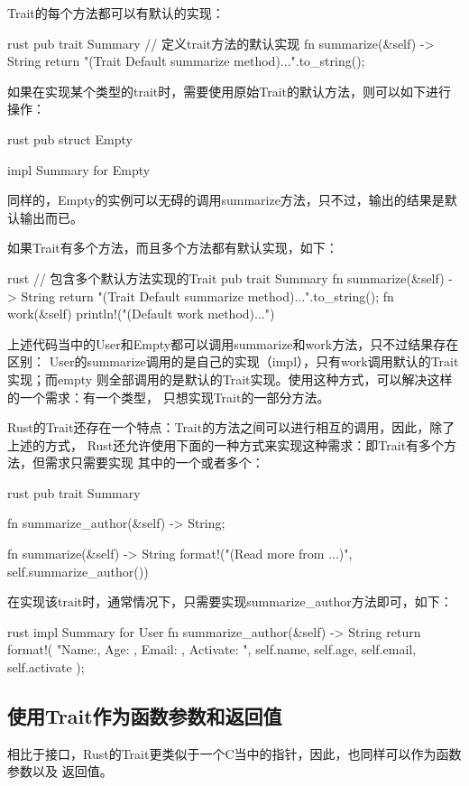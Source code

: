 Trait的每个方法都可以有默认的实现：
\begin{code-block}{rust}
pub trait Summary {
    // 定义trait方法的默认实现
    fn summarize(&self) -> String {
        return "(Trait Default summarize method)...".to_string();
    }
}
\end{code-block}

如果在实现某个类型的trait时，需要使用原始Trait的默认方法，则可以如下进行操作：
\begin{code-block}{rust}
pub struct Empty {}

impl Summary for Empty {}
\end{code-block}
同样的，Empty的实例可以无碍的调用summarize方法，只不过，输出的结果是默认输出而已。

如果Trait有多个方法，而且多个方法都有默认实现，如下：
\begin{code-block}{rust}
// 包含多个默认方法实现的Trait
pub trait Summary {
    fn summarize(&self) -> String {
        return "(Trait Default summarize method)...".to_string();
    }
    fn work(&self) {
        println!("(Default work method)...")
    }
}
\end{code-block}

上述代码当中的User和Empty都可以调用summarize和work方法，只不过结果存在区别：
User的summarize调用的是自己的实现（impl），只有work调用默认的Trait实现；而empty
则全部调用的是默认的Trait实现。使用这种方式，可以解决这样的一个需求：有一个类型，
只想实现Trait的一部分方法。

Rust的Trait还存在一个特点：Trait的方法之间可以进行相互的调用，因此，除了上述的方式，
Rust还允许使用下面的一种方式来实现这种需求：即Trait有多个方法，但需求只需要实现
其中的一个或者多个：
\begin{code-block}{rust}
pub trait Summary {
    fn summarize_author(&self) -> String;

    fn summarize(&self) -> String {
        format!("(Read more from {}...)", self.summarize_author())
    }
}
\end{code-block}
在实现该trait时，通常情况下，只需要实现summarize\_author方法即可，如下：
\begin{code-block}{rust}
impl Summary for User {
    fn summarize_author(&self) -> String {
        return format!(
            "Name:{}, Age: {}, Email: {}, Activate: {}",
            self.name, self.age, self.email, self.activate
        );
    }
}
\end{code-block}

\subsection{使用Trait作为函数参数和返回值}
相比于接口，Rust的Trait更类似于一个C当中的指针，因此，也同样可以作为函数参数以及
返回值。

